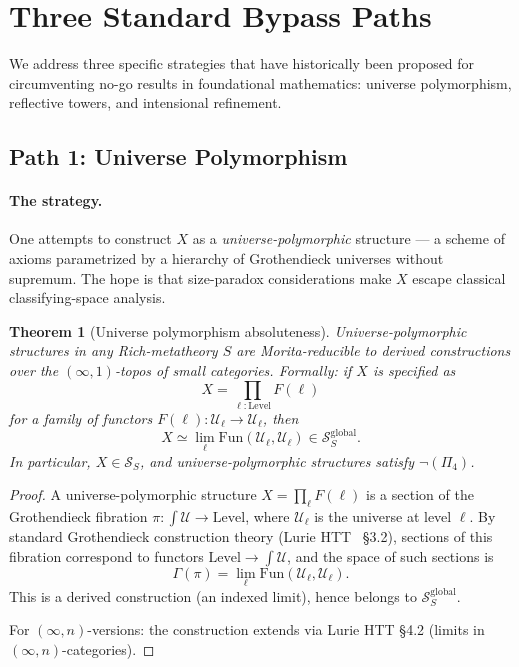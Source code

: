 \documentclass[11pt]{article}
\theoremstyle{plain}
\newtheorem{theorem}{Theorem}[section]
\theoremstyle{definition}
\newcommand{\cS}{\mathcal{S}}
\newcommand{\Fun}{\mathrm{Fun}}
\newcommand{\cU}{\mathcal{U}}
\begin{document}
\section{Three Standard Bypass Paths}\label{sec:bypass}

We address three specific strategies that have historically been proposed for circumventing no-go results in foundational mathematics: universe polymorphism, reflective towers, and intensional refinement.

\subsection{Path 1: Universe Polymorphism}\label{sec:bypass-universe}

\paragraph{The strategy.} One attempts to construct $X$ as a \emph{universe-polymorphic} structure --- a scheme of axioms parametrized by a hierarchy of Grothendieck universes without supremum. The hope is that size-paradox considerations make $X$ escape classical classifying-space analysis.

\begin{theorem}[Universe polymorphism absoluteness]\label{thm:universe}
Universe-polymorphic structures in any Rich-metatheory $S$ are Morita-reducible to derived constructions over the $(\infty, 1)$-topos of small categories. Formally: if $X$ is specified as
\[ X = \prod_{\ell : \mathrm{Level}} F(\ell) \]
for a family of functors $F(\ell) : \cU_\ell \to \cU_\ell$, then
\[ X \simeq \lim_\ell \Fun(\cU_\ell, \cU_\ell) \in \cS_S^{\mathrm{global}}. \]
In particular, $X \in \cS_S$, and universe-polymorphic structures satisfy $\neg (\Pi_4)$.
\end{theorem}

\begin{proof}
A universe-polymorphic structure $X = \prod_\ell F(\ell)$ is a section of the Grothendieck fibration $\pi : \int \cU \to \mathrm{Level}$, where $\cU_\ell$ is the universe at level $\ell$. By standard Grothendieck construction theory (Lurie HTT~\cite{LurieHTT} \S 3.2), sections of this fibration correspond to functors $\mathrm{Level} \to \int \cU$, and the space of such sections is
\[ \Gamma(\pi) = \lim_\ell \Fun(\cU_\ell, \cU_\ell). \]
This is a derived construction (an indexed limit), hence belongs to $\cS_S^{\mathrm{global}}$.

For $(\infty, n)$-versions: the construction extends via Lurie HTT \S 4.2 (limits in $(\infty, n)$-categories).
\end{proof}
\end{document}

